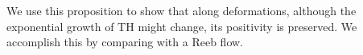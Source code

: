 \documentclass{amsart}
\renewcommand{\TH}{\operatorname{TH}}
\newcommand{\tiilde}{\widetilde}
\newtheorem{theorem}{Theorem}
\theoremstyle{definition}
\theoremstyle{remark}
\numberwithin{equation}{section}
\begin{document}
We use this proposition to show that along deformations, although the exponential growth of TH might change, its positivity is preserved. We accomplish this by comparing with a Reeb flow. 

\end{document}
